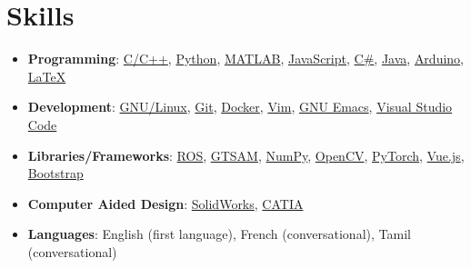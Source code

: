 \documentclass[letterpaper,11pt]{article}
\makeatletter
\newcommand{\resumeSkillItemHeading}[2]{
  \item\small{
    \textbf{#1}{: #2 \vspace{-2pt}}
  }
}
\newcommand{\resumeSubheading}[4]{
  \vspace{-1pt}\item
    \begin{tabular*}{0.97\textwidth}[t]{l@{\extracolsep{\fill}}r}
      \textbf{#1} & #2 \\
      \textit{\small#3} & \textit{\small #4} \\
    \end{tabular*}\vspace{-5pt}
}
\newcommand{\resumeSubHeadingListEnd}{\end{itemize}}
\newcommand{\resumeItemListStart}{\begin{itemize}}
\newcommand{\resumeItemListEnd}{\end{itemize}\vspace{-5pt}}
\makeatother
\begin{document}







\section{Skills}
\resumeItemListStart

\resumeSkillItemHeading
{Programming}
{\href{https://www.cplusplus.com/}{C/C++}, \href{https://www.python.org/}{Python}, \href{https://www.mathworks.com/products/matlab.html}{MATLAB}, \href{https://www.javascript.com/}{JavaScript}, \href{https://docs.microsoft.com/en-us/dotnet/csharp/}{C\#}, \href{https://www.java.com/}{Java}, \href{https://www.arduino.cc/}{Arduino}, \href{https://www.latex-project.org/}{\LaTeX}}

\resumeSkillItemHeading
{Development}
{\href{https://www.linux.org}{GNU/Linux}, \href{https://git-scm.com}{Git}, \href{https://www.docker.com}{Docker}, \href{https://www.vim.org}{Vim}, \href{https://www.gnu.org/software/emacs/}{GNU Emacs}, \href{https://code.visualstudio.com/}{Visual Studio Code}}

\resumeSkillItemHeading
{Libraries/Frameworks}
{\href{https://www.ros.org/}{ROS}, \href{https://gtsam.org/}{GTSAM}, \href{https://numpy.org/}{NumPy}, \href{https://opencv.org}{OpenCV}, \href{https://pytorch.org/}{PyTorch}, \href{https://vuejs.org/}{Vue.js}, \href{https://getbootstrap.com/}{Bootstrap}}

\resumeSkillItemHeading
{Computer Aided Design}
{\href{https://www.solidworks.com/}{SolidWorks}, \href{https://www.3ds.com/products-services/catia/}{CATIA}}


\resumeSkillItemHeading
{Languages}
{English (first language), French (conversational), Tamil (conversational)}

\resumeItemListEnd

\end{document}
